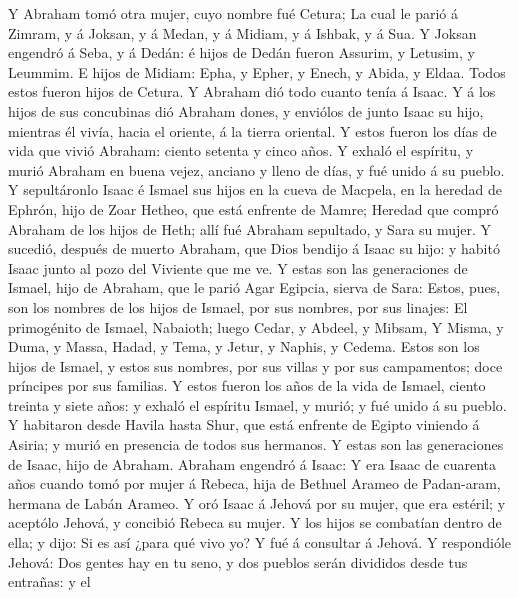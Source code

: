  Y Abraham tomó otra mujer, cuyo nombre fué Cetura;
 La cual le parió á Zimram, y á Joksan, y á Medan, y á
Midiam, y á Ishbak, y á Sua.  Y Joksan engendró á Seba, y
á Dedán: é hijos de Dedán fueron Assurim, y Letusim, y Leummim.
 E hijos de Midiam: Epha, y Epher, y Enech, y Abida, y
Eldaa. Todos estos fueron hijos de Cetura.  Y Abraham dió
todo cuanto tenía á Isaac.  Y á los hijos de sus
concubinas dió Abraham dones, y enviólos de junto Isaac su hijo,
mientras él vivía, hacia el oriente, á la tierra oriental.
 Y estos fueron los días de vida que vivió Abraham: ciento
setenta y cinco años.  Y exhaló el espíritu, y murió
Abraham en buena vejez, anciano y lleno de días, y fué unido á su
pueblo.  Y sepultáronlo Isaac é Ismael sus hijos en la
cueva de Macpela, en la heredad de Ephrón, hijo de Zoar Hetheo, que está
enfrente de Mamre;  Heredad que compró Abraham de los
hijos de Heth; allí fué Abraham sepultado, y Sara su mujer.
 Y sucedió, después de muerto Abraham, que Dios bendijo á
Isaac su hijo: y habitó Isaac junto al pozo del Viviente que me ve.
 Y estas son las generaciones de Ismael, hijo de Abraham,
que le parió Agar Egipcia, sierva de Sara:  Estos, pues,
son los nombres de los hijos de Ismael, por sus nombres, por sus
linajes: El primogénito de Ismael, Nabaioth; luego Cedar, y Abdeel, y
Mibsam,  Y Misma, y Duma, y Massa,  Hadad,
y Tema, y Jetur, y Naphis, y Cedema.  Estos son los hijos
de Ismael, y estos sus nombres, por sus villas y por sus campamentos;
doce príncipes por sus familias.  Y estos fueron los años
de la vida de Ismael, ciento treinta y siete años: y exhaló el espíritu
Ismael, y murió; y fué unido á su pueblo.  Y habitaron
desde Havila hasta Shur, que está enfrente de Egipto viniendo á Asiria;
y murió en presencia de todos sus hermanos.  Y estas son
las generaciones de Isaac, hijo de Abraham. Abraham engendró á Isaac:
 Y era Isaac de cuarenta años cuando tomó por mujer á
Rebeca, hija de Bethuel Arameo de Padan-aram, hermana de Labán Arameo.
 Y oró Isaac á Jehová por su mujer, que era estéril; y
aceptólo Jehová, y concibió Rebeca su mujer.  Y los hijos
se combatían dentro de ella; y dijo: Si es así ¿para qué vivo yo? Y fué
á consultar á Jehová.  Y respondióle Jehová: Dos gentes
hay en tu seno, y dos pueblos serán divididos desde tus entrañas: y el
